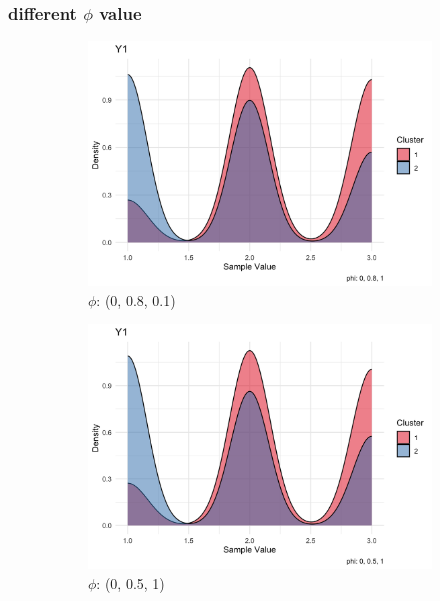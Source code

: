 \documentclass{article}
\begin{document}
\subsubsection*{different $\phi$ value}
\begin{figure}[h]
  \centering
  \begin{subfigure}{0.3\textwidth}
      \centering
      \includegraphics[width=\textwidth]{images/phi_0_08_1.png}
      \caption{$\phi$: (0, 0.8, 0.1)}
  \end{subfigure}
  \hfill
  \begin{subfigure}{0.3\textwidth}
      \centering
      \includegraphics[width=\textwidth]{images/phi_0_05_1.png}
      \caption{$\phi$: (0, 0.5, 1)}
  \end{subfigure}
  \hfill
  \begin{subfigure}{0.3\textwidth}

\end{subfigure}
\end{figure}
\end{document}
